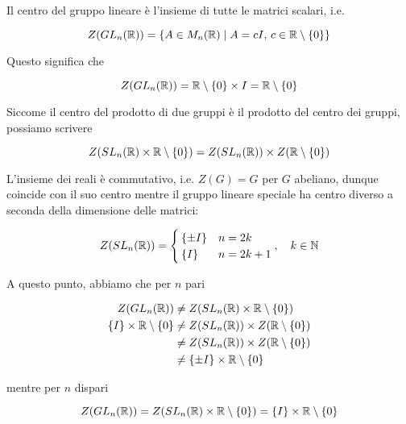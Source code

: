 Il centro del gruppo lineare è l'insieme di tutte le matrici scalari, i.e.

\begin{equation}
	Z(GL_{n}(\mathbb{R})) = \{ A \in M_{n}(\mathbb{R}) \mid A = c I, \, c \in \mathbb{R} \setminus \{0\} \}
\end{equation}

Questo significa che

\begin{equation}
	Z(GL_{n}(\mathbb{R})) = \mathbb{R} \setminus \{0\} \times I = \mathbb{R} \setminus \{0\}
\end{equation}

Siccome il centro del prodotto di due gruppi è il prodotto del centro dei gruppi, possiamo scrivere

\begin{equation}
	Z(SL_{n}(\mathbb{R}) \times \mathbb{R} \setminus \{0\}) = Z(SL_{n}(\mathbb{R})) \times Z(\mathbb{R} \setminus \{0\})
\end{equation}

L'insieme dei reali è commutativo, i.e. $ Z(G) = G $ per $ G $ abeliano, dunque coincide con il suo centro mentre il gruppo lineare speciale ha centro diverso a seconda della dimensione delle matrici:

\begin{equation}
	Z(SL_{n}(\R)) = %
	\begin{cases}
		\{ \pm I \} & n = 2 k\\
		\{ I \} & n = 2 k + 1
	\end{cases}%
	\qcomma k \in \N
\end{equation}

A questo punto, abbiamo che per $ n $ pari

\begin{align}
	\begin{split}
		Z(GL_{n}(\mathbb{R})) &\neq Z(SL_{n}(\mathbb{R}) \times \mathbb{R} \setminus \{0\})\\
		\{ I \} \times \mathbb{R} \setminus \{0\} &\neq Z(SL_{n}(\mathbb{R})) \times Z(\mathbb{R} \setminus \{0\})\\
		&\neq Z(SL_{n}(\mathbb{R})) \times Z(\mathbb{R} \setminus \{0\})\\
		&\neq \{ \pm I \} \times \mathbb{R} \setminus \{0\}
	\end{split}
\end{align}

mentre per $ n $ dispari

\begin{equation}
	Z(GL_{n}(\mathbb{R})) = Z(SL_{n}(\mathbb{R}) \times \mathbb{R} \setminus \{0\}) = \{ I \} \times \mathbb{R} \setminus \{0\}
\end{equation}

